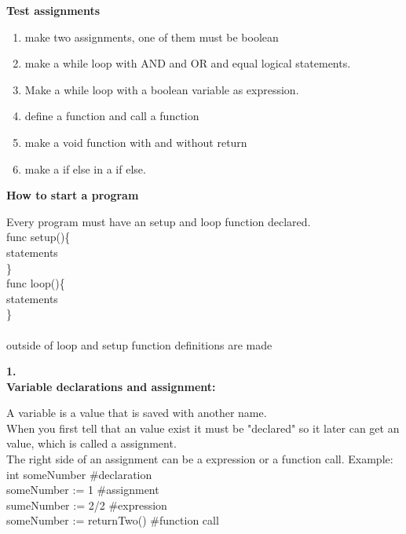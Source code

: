 \label{user_guide_appendix}

\textbf{Test assignments}
\begin{enumerate}
    \item make two assignments, one of them must be boolean
    \item make a while loop with AND and OR and equal logical statements. 
    \item Make a while loop with a boolean variable as expression.
    \item define a function and call a function
    \item make a void function with and without return
    \item make a if else in a if else.
\end{enumerate}
\begin{flushleft}
\textbf{How to start a program} 
\end{flushleft}
Every program must have an setup and loop function declared. \\
func setup()\{\\ 
\hspace*{1cm} statements\\
\}\\
func loop()\{\\
\hspace*{1cm} statements\\
\}\\\\
outside of loop and setup function definitions are made
\begin{flushleft}
\textbf{1.}\\
\textbf{Variable declarations and assignment:}
\end{flushleft}
A variable is a value that is saved with another name.\\
When you first tell that an value exist it must be "declared" so it later can  get an value, which is called a assignment.\\
The right side of an assignment can be a expression or a function call.
Example:\\
int someNumber \hspace*{22mm}             \#declaration\\
someNumber := 1 \hspace*{20mm}            \#assignment\\
sumeNumber := 2/2 \hspace*{16mm}          \#expression\\
someNumber := returnTwo() \hspace*{2mm}  \#function call
